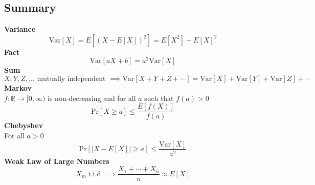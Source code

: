 \documentclass{article}\usepackage{amsmath,amssymb,amsthm,tikz,tkz-graph,color,chngpage,soul,hyperref,csquotes,graphicx,floatrow,listings, mathrsfs,framed,scrextend}\newcommand*{\QEDB}{\hfill\ensuremath{\square}}\newtheorem*{prop}{Proposition}\renewcommand{\theenumi}{\alph{enumi}}\usepackage[shortlabels]{enumitem}\usepackage[nobreak=true]{mdframed}\usetikzlibrary{matrix,calc}\MakeOuterQuote{"}\usepackage[margin=0.75in]{geometry} \newtheorem{theorem}{Theorem}
\newcommand{\R}{\mathbb R}
\newcommand{\x}[1]{\textrm{#1}}
\newcommand{\pr}[1]{\textrm{Pr}[#1]}
\newcommand{\xs}[1]{\textrm{ #1 }}
\newcommand{\eq}[1]{\begin{equation}#1\end{equation}}
\newcommand{\eqs}[1]{\begin{mdframed}#1\end{mdframed}}
\providecommand{\abs}[1]{\lvert#1\rvert} \providecommand{\norm}[1]{\lVert#1\rVert}
\newcommand{\E}[1]{E[#1]}
\newcommand{\var}[1]{\x{Var}[#1]}
\begin{document}
\subsection*{Summary}
\eqs{
\textbf{Variance}
\eq{\var{X}=\E{(X-\E{X})^2}=\E{X^2}-\E{X}^2}
\textbf{Fact}
\eq{\var{aX+b}=a^2\var{X}}
\textbf{Sum}
\eq{X,Y,Z,\ldots\xs{mutually independent}\implies\var{X+Y+Z+\cdots}=\var{X}+\var{Y}+\var{Z}+\cdots}
\textbf{Markov}\\
$f: \R \rightarrow [0, \infty)$ is non-decreasing and for all $a$ such that $f(a) > 0$
\eq{\pr{X\ge a}\le\frac{\E{f(X)}}{f(a)}}
\textbf{Chebyshev}\\
For all $a > 0$
\eq{\pr{\abs{X-\E{X}}\ge a}\le\frac{\var{X}}{a^2}}
\textbf{Weak Law of Large Numbers}
\eq{X_m\xs{i.i.d}\implies\frac{X_1+\cdots+X_n}{n}\approx\E{X}}
}
\end{document}
